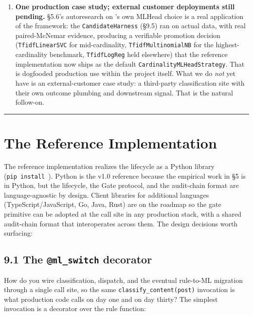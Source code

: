 \begin{enumerate}
  set explicitly; we do not provide a fleet-aggregated guarantee.
\item
  \textbf{One production case study; external customer deployments still
  pending.} §5.6's autoresearch on \sysname{}'s own MLHead choice is a
  real application of the framework: the \texttt{CandidateHarness}
  (§9.5) ran on actual data, with real paired-McNemar evidence,
  producing a verifiable promotion decision (\texttt{TfidfLinearSVC} for
  mid-cardinality, \texttt{TfidfMultinomialNB} for the
  highest-cardinality benchmark, \texttt{TfidfLogReg} held elsewhere)
  that the reference implementation now ships as the default
  \texttt{CardinalityMLHeadStrategy}. That is dogfooded production use
  within the project itself. What we do \emph{not} yet have is an
  external-customer case study: a third-party classification site with
  their own outcome plumbing and downstream signal. That is the natural
  follow-on.
\end{enumerate}

\begin{center}\rule{0.5\linewidth}{0.5pt}\end{center}

\section{The \sysname{} Reference
Implementation}\label{the-\pkgname{}-reference-implementation}

The reference implementation realizes the lifecycle as a Python library
(\texttt{pip\ install\ \pkgname{}}). Python is the v1.0 reference because
the empirical work in §5 is in Python, but the lifecycle, the Gate
protocol, and the audit-chain format are language-agnostic by design.
Client libraries for additional languages (TypeScript/JavaScript, Go,
Java, Rust) are on the roadmap so the gate primitive can be adopted at
the call site in any production stack, with a shared audit-chain format
that interoperates across them. The design decisions worth surfacing:

\subsection{\texorpdfstring{9.1 The \texttt{@ml\_switch}
decorator}{9.1 The @ml\_switch decorator}}\label{the-ml_switch-decorator}

How do you wire classification, dispatch, and the eventual rule-to-ML
migration through a single call site, so the same
\texttt{classify\_content(post)} invocation is what production code
calls on day one and on day thirty? The simplest invocation is a
decorator over the rule function:

